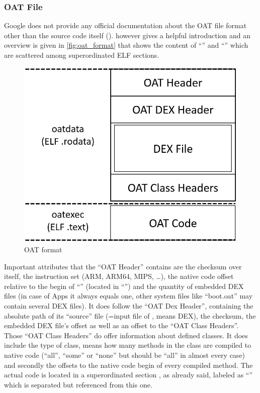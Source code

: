 \subsubsection{OAT File}\label{section:oat_file}
Google does not provide any official documentation about the OAT
file format other than the source code itself
(). \parencite{hiding_behind_art}
however gives a helpful introduction and an overview is given
in \autoref{fig:oat_format} that shows the content of ``'' and
``'' which are scattered among superordinated ELF sections.

\begin{figure}[htb]
  \centering
  \includegraphics[scale=0.4]{figures/oat_format}
  \caption[OAT format]{OAT format}
  \label{fig:oat_format}
\end{figure}

Important attributes that the ``OAT Header'' contains are the
checksum over itself,
the instruction set (ARM, ARM64, MIPS, \ldots), the native code
offset relative to the begin of ``'' (located in
``'') and the quantity of embedded
DEX files (in case of Apps it always equals one, other system files like
``boot.oat'' may contain several DEX files). It does follow the
``OAT Dex Header'', containing
the absolute path of its ``source'' file (=input file of ,
means DEX), the checksum, the
embedded DEX file's offset as well as
an offset to the ``OAT Class Headers''. Those ``OAT Class Headers''
do offer information about defined classes. It does include the type
of class, means how many methods in the class
are compiled to native code (``all'', ``some'' or ``none'' but
should be ``all'' in almost every case) and secondly
the offsets to the native code begin of every compiled method.
The actual code is located in a superordinated section
, as already said, labeled as ``'' which is separated but referenced from this one.

